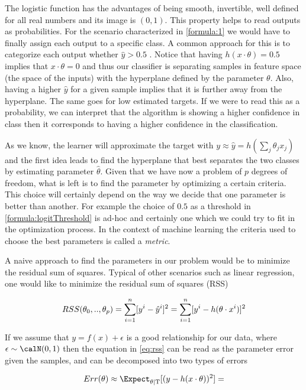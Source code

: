 The logistic function has the advantages of being smooth, invertible, well defined for all real numbers and its image is $(0,1)$. This property helps to read outputs as probabilities. For the scenario characterized in \ref{formula:1} we would have to finally assign each output to a specific class. A common approach for this is to categorize each output whether $\hat{y} > 0.5$ \label{formula:logitThreshold}. Notice that having $h(x \cdot \theta) = 0.5$ implies that $x \cdot  \theta = 0$ and thus our classifier is separating samples in feature space (the space of the inputs) with the hyperplane defined by the parameter $\theta$. Also, having a higher $\hat{y}$ for a given sample implies that it is further away from the hyperplane. The same goes for low estimated targets. If we were to read this as a probability, we can interpret that the algorithm is showing a higher confidence in class  then it corresponds to having a higher confidence in the classification.



As we know, the learner will approximate the target with $y \approx \hat{y} = h\left(\sum_{j}\theta_jx_j\right)$ and the first idea leads to find the hyperplane that best separates the two classes by estimating parameter $\hat{\theta}$. Given that we have now a problem of $p$ degrees of freedom, what is left is to find the parameter by optimizing a certain criteria. This choice will certainly depend on the way we decide that one parameter is better than another. For example the choice of $0.5$ as a threshold in \ref{formula:logitThreshold} is ad-hoc and certainly one which we could try to fit in the optimization process. In the context of machine learning the criteria used to choose the best parameters is called a \textit{metric}.

A naive approach to find the parameters in our problem would be to minimize the residual sum of squares. Typical of other scenarios such as linear regression, one would like to minimize the residual sum of squares (RSS)  

\begin{equation} \label{eq:rss}
RSS(\theta_0,..,\theta_p)  = \sum_{i=1}^n [y^i - \hat{y}^i]^2  \\
=  \sum_{i=1}^n [y^i - h( \theta \cdot x^i)]^2
\end{equation}

If we assume that $y  =  f(x)  +  \epsilon $ is a good relationship for our data, where $\epsilon \sim \calN(0,1) $ then the equation in \ref{eq:rss} can be read as the parameter error given the samples, and can be decomposed into two types of errors

\[
    Err(\theta) \approx \Expect_{\theta | \mathrm{T}}[(y - h(x \cdot \theta) )^2]
    = 
    \]
